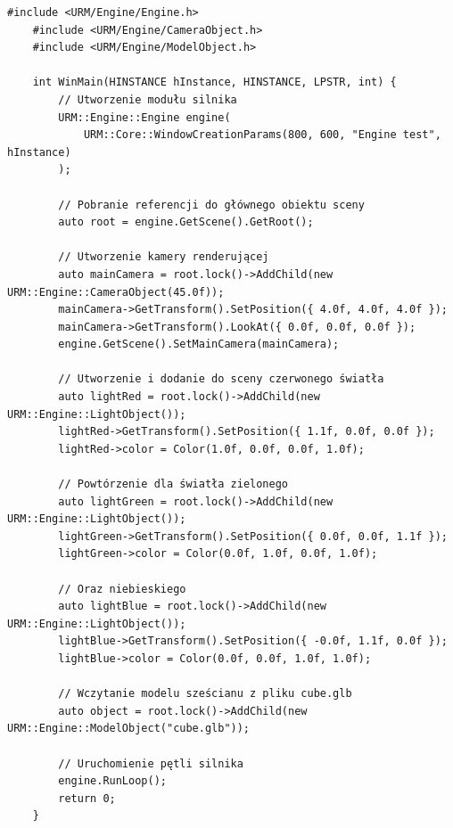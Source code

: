 \begin{lstlisting}[caption={Aplikacja przykładowa wykorzystująca API modułu silnika}, label={lst:appendix:engineDemo}]
	#include <URM/Engine/Engine.h>
	#include <URM/Engine/CameraObject.h>
	#include <URM/Engine/ModelObject.h>
	
	int WinMain(HINSTANCE hInstance, HINSTANCE, LPSTR, int) {
		// Utworzenie modułu silnika
		URM::Engine::Engine engine(
			URM::Core::WindowCreationParams(800, 600, "Engine test", hInstance)
		);
		
		// Pobranie referencji do głównego obiektu sceny
		auto root = engine.GetScene().GetRoot();
		
		// Utworzenie kamery renderującej
		auto mainCamera = root.lock()->AddChild(new URM::Engine::CameraObject(45.0f));
		mainCamera->GetTransform().SetPosition({ 4.0f, 4.0f, 4.0f });
		mainCamera->GetTransform().LookAt({ 0.0f, 0.0f, 0.0f });
		engine.GetScene().SetMainCamera(mainCamera);
		
		// Utworzenie i dodanie do sceny czerwonego światła
		auto lightRed = root.lock()->AddChild(new URM::Engine::LightObject());
		lightRed->GetTransform().SetPosition({ 1.1f, 0.0f, 0.0f });
		lightRed->color = Color(1.0f, 0.0f, 0.0f, 1.0f);
		
		// Powtórzenie dla światła zielonego
		auto lightGreen = root.lock()->AddChild(new URM::Engine::LightObject());
		lightGreen->GetTransform().SetPosition({ 0.0f, 0.0f, 1.1f });
		lightGreen->color = Color(0.0f, 1.0f, 0.0f, 1.0f);
		
		// Oraz niebieskiego
		auto lightBlue = root.lock()->AddChild(new URM::Engine::LightObject());
		lightBlue->GetTransform().SetPosition({ -0.0f, 1.1f, 0.0f });
		lightBlue->color = Color(0.0f, 0.0f, 1.0f, 1.0f);
		
		// Wczytanie modelu sześcianu z pliku cube.glb
		auto object = root.lock()->AddChild(new URM::Engine::ModelObject("cube.glb"));
		
		// Uruchomienie pętli silnika
		engine.RunLoop();
		return 0;
	}
\end{lstlisting}